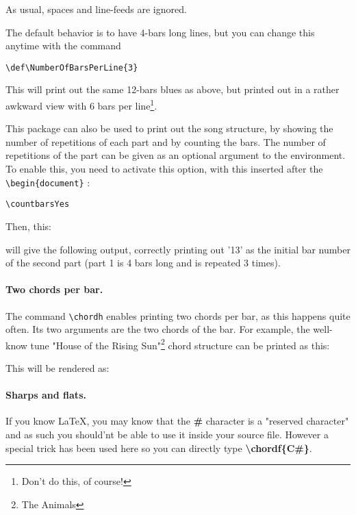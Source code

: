\documentclass[11pt]{article}
\newcommand{\btt}{\bfseries \ttfamily }
\newcommand{\tbs}{\textbackslash{}}
\begin{document}


As usual, spaces and line-feeds are ignored.

The default behavior is to have 4-bars long lines, but you can change this anytime with the command 

\begin{lstlisting}
\def\NumberOfBarsPerLine{3}
\end{lstlisting}

This will print out the same 12-bars blues as above, but printed out in a rather awkward view with 6 bars per line\footnote{Don't do this, of course!}.

\def\NumberOfBarsPerLine{6}


This package can also be used to print out the song structure, by showing the number of repetitions of each part and by counting the bars.
The number of repetitions of the part can be given as an optional argument to the environment.
To enable this, you need to activate this option, with this inserted after the \verb!\begin{document}! :

\begin{lstlisting}
\countbarsYes
\end{lstlisting}

Then, this:


will give the following output, correctly printing out '13' as the initial bar number of the second part (part 1 is 4 bars long and is repeated 3 times).

\def\NumberOfBarsPerLine{4}
\resetchordbars
\countbarsYes


\paragraph{Two chords per bar.} 
The command \verb|\chordh| enables printing two chords per bar, as this happens quite often.
Its two arguments are the two chords of the bar.
For example, the well-know tune "House of the Rising Sun"\footnote{The Animals} chord structure can be printed as this:



This will be rendered as:
\resetchordbars
\countbarsNo


\paragraph{Sharps and flats.} If you know \LaTeX, you may know that the {\btt \#} character is a "reserved character" and as such you should'nt be able to use it inside your source file.
However a special trick has been used here so you can directly type {\btt \tbs chordf\{C\#\}}.
\end{document}
